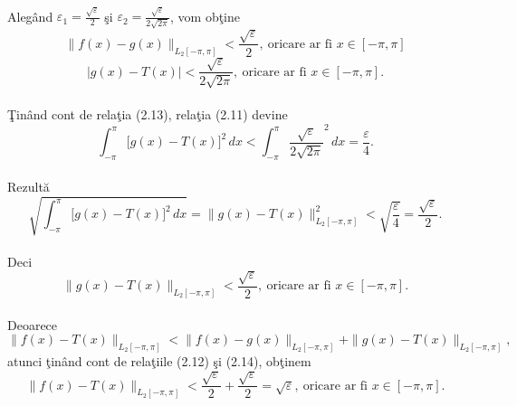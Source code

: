 \documentclass[a4paper,openany,12pt]{report}
\begin{document}
\paragraph*{} Aleg\^ and $\varepsilon_1 = \frac{\sqrt \varepsilon}{2}$ \c si $\varepsilon_2 = \frac{\sqrt \varepsilon}{2\sqrt{2\pi}}$, vom ob\c tine
\begin{equation}
\|f(x) - g(x)\|_{L_2[-\pi, \pi]} <  \frac{\sqrt \varepsilon}{2},\: \text{oricare ar fi } x \in [-\pi, \pi]
\end {equation}
\begin{equation}
\left | g(x) - T(x) \right | <  \frac{\sqrt \varepsilon}{2\sqrt{2\pi}},\: \text{oricare ar fi } x \in [-\pi, \pi].
\end {equation}
\paragraph*{} \c Tin\^ and cont de rela\c tia (2.13), rela\c tia (2.11) devine
\begin{equation*}
\int_{-\pi}^{\pi} \Big[g(x) - T(x)\Big]^2\,dx < \int_{-\pi}^{\pi} {\frac{\sqrt \varepsilon}{2\sqrt{2\pi}}}^2\, dx = \frac{\varepsilon}{4}. 
\end{equation*}
\paragraph*{}Rezult\u a
\begin{equation*}
\sqrt{\int_{-\pi}^{\pi} \Big[g(x) - T(x)\Big]^2\,dx } = \|g(x) - T(x)\|_{L_2[-\pi, \pi]}^2 < \sqrt{\frac{\varepsilon}{4}} = \frac{\sqrt \varepsilon}{2}.
\end{equation*}
\paragraph*{}Deci
\begin{equation}
\|g(x) - T(x)\|_{L_2[-\pi, \pi]} < \frac{\sqrt \varepsilon}{2}, \: \text{oricare ar fi } x \in [-\pi, \pi].
\end{equation}
\paragraph*{} Deoarece
\begin{equation*}
\|f(x) - T(x)\|_{L_2[-\pi, \pi]} < \|f(x) - g(x)\|_{L_2[-\pi, \pi]} + \|g(x) - T(x)\|_{L_2[-\pi, \pi]},
\end{equation*}
atunci \c tin\^ and cont de rela\c tiile (2.12) \c si (2.14), ob\c tinem
\begin{equation*}
\|f(x) - T(x)\|_{L_2[-\pi, \pi]} < \frac{\sqrt \varepsilon}{2} + \frac{\sqrt \varepsilon}{2} = \sqrt \varepsilon,\: \text{oricare ar fi } x \in [-\pi, \pi].
\end{equation*}
\end{document}
